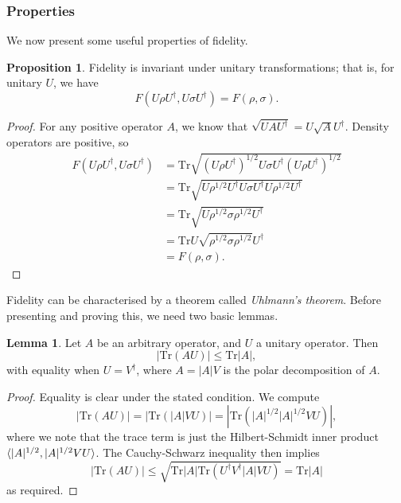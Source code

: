 \documentclass[12pt,a4paper]{report}
\numberwithin{equation}{section}
\newcommand{\tr}{\text{Tr}}
\theoremstyle{definition}
\theoremstyle{theorem}
\theoremstyle{theorem}
\newtheorem{lemma}{Lemma}[section]
\theoremstyle{example}
\newtheorem{proposition}{Proposition}
\theoremstyle{definition}
\begin{document}
\subsubsection{Properties}
We now present some useful properties of fidelity.
\begin{proposition}
	Fidelity is invariant under unitary transformations; that is, for unitary $U$, we have
	\begin{equation}
		F(U\rho U^{\dagger},U\sigma U^{\dagger})=F(\rho,\sigma).
	\end{equation}
\end{proposition}
\begin{proof}
	For any positive operator $A$, we know that $\sqrt{UAU^{\dagger}}=U\sqrt{A}U^{\dagger}$. Density operators are positive, so
	\begin{equation}
		\begin{aligned}
			F(U\rho U^{\dagger},U\sigma U^{\dagger})&=\tr\sqrt{(U\rho U^{\dagger})^{1/2}U\sigma U^{\dagger}(U\rho U^{\dagger})^{1/2}}\\&=\tr\sqrt{U\rho^{1/2}U^{\dagger}U\sigma U^{\dagger}U\rho^{1/2}U^{\dagger}}\\&=\tr\sqrt{U\rho^{1/2}\sigma\rho^{1/2}U^{\dagger}}\\&=\tr U\sqrt{\rho^{1/2}\sigma\rho^{1/2}}U^{\dagger}\\&=F(\rho,\sigma).
		\end{aligned}
	\end{equation}
\end{proof}
Fidelity can be characterised by a theorem called \textit{Uhlmann's theorem}. Before presenting and proving this, we need two basic lemmas.
\begin{lemma}
	Let $A$ be an arbitrary operator, and $U$ a unitary operator. Then
	\begin{equation}
		|\tr(AU)|\leq\tr|A|,
	\end{equation}
	with equality when $U=V^{\dagger}$, where $A=|A|V$ is the polar decomposition of $A$.
\end{lemma}
\begin{proof}
	Equality is clear under the stated condition. We compute
	\begin{equation}
		|\tr(AU)|=|\tr(|A|VU)|=|\tr(|A|^{1/2}|A|^{1/2}VU)|,
	\end{equation}
	where we note that the trace term is just the Hilbert-Schmidt inner product $\braket{|A|^{1/2},|A|^{1/2}VU}$. The Cauchy-Schwarz inequality then implies
	\begin{equation}
		|\tr(AU)|\leq\sqrt{\tr|A|\tr(U^{\dagger}V^{\dagger}|A|VU)}=\tr|A|
	\end{equation}
	as required.
\end{proof}
\end{document}
